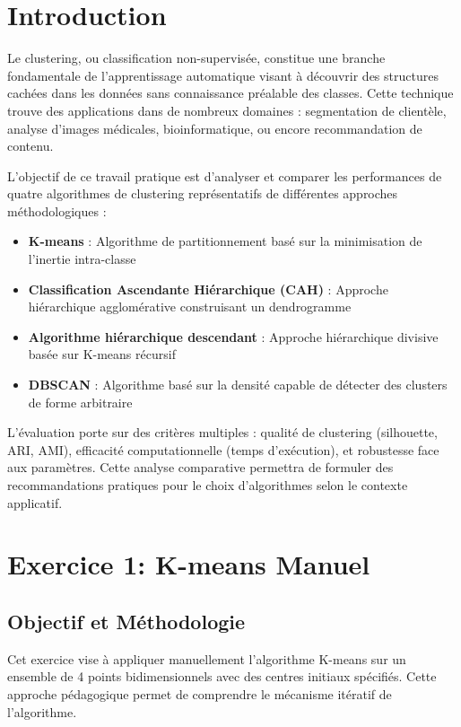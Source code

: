 \documentclass[12pt,a4paper]{article}
\begin{document}
\newpage

\section{Introduction}

Le clustering, ou classification non-supervisée, constitue une branche fondamentale de l'apprentissage automatique visant à découvrir des structures cachées dans les données sans connaissance préalable des classes. Cette technique trouve des applications dans de nombreux domaines : segmentation de clientèle, analyse d'images médicales, bioinformatique, ou encore recommandation de contenu.

L'objectif de ce travail pratique est d'analyser et comparer les performances de quatre algorithmes de clustering représentatifs de différentes approches méthodologiques :

\begin{itemize}
    \item \textbf{K-means} : Algorithme de partitionnement basé sur la minimisation de l'inertie intra-classe
    \item \textbf{Classification Ascendante Hiérarchique (CAH)} : Approche hiérarchique agglomérative construisant un dendrogramme
    \item \textbf{Algorithme hiérarchique descendant} : Approche hiérarchique divisive basée sur K-means récursif
    \item \textbf{DBSCAN} : Algorithme basé sur la densité capable de détecter des clusters de forme arbitraire
\end{itemize}

L'évaluation porte sur des critères multiples : qualité de clustering (silhouette, ARI, AMI), efficacité computationnelle (temps d'exécution), et robustesse face aux paramètres. Cette analyse comparative permettra de formuler des recommandations pratiques pour le choix d'algorithmes selon le contexte applicatif.

\section{Exercice 1: K-means Manuel}

\subsection{Objectif et Méthodologie}

Cet exercice vise à appliquer manuellement l'algorithme K-means sur un ensemble de 4 points bidimensionnels avec des centres initiaux spécifiés. Cette approche pédagogique permet de comprendre le mécanisme itératif de l'algorithme.
\end{document}

